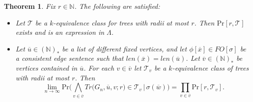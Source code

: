 \documentclass[12pt,notitlepage,a4paper]{article}
\newtheorem{theorem}{Theorem}[section]
\theoremstyle{definition}
\newcommand{\N}{\mathbb{N}}
\newcommand{\Ln}{\lim\limits_{n\to \infty}}
\begin{document}
\begin{theorem} \label{thm:BigTrees}
	Fix $r\in \N$. The following are satisfied:
	\begin{itemize}
		\item[(1)] Let $\mathcal{T}$ be a
		$k$-equivalence class for trees with radii at most $r$.
		Then $\mathrm{Pr}[r,\mathcal{T}]$ exists and is an expression
		in $\Lambda$.
		\item[(2)] Let $\overline{u}\in (\N)_*$ be a list of different fixed 
		vertices, and let $\phi[\overline{x}]\in FO[\sigma]$ be a consistent
		edge sentence such that 
		$len(\overline{x})=len(\overline{u})$.
		Let $\overline{v}\in (\N)_*$ be vertices contained
		in $\overline{u}$. For each $v\in \overline{v}$
		let $\mathcal{T}_v$ be a $k$-equivalence class
		of trees with radii	at most $r$. Then
		\[
		\Ln \mathrm{Pr}\big( \bigwedge_{v\in \overline{v}} 
		Tr\big(G_n, \overline{u},v;r\big)\in \mathcal{T}_v 
		\, | \, \sigma(\overline{w})
		\big)= \prod_{v\in \overline{v}} \mathrm{Pr}[r,\mathcal{T}_v]. \]	 	
	\end{itemize}
\end{theorem}
\end{document}
